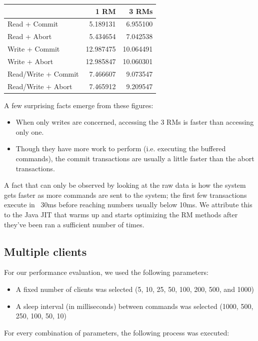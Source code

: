 \documentclass[11pt]{article}
\begin{document}
\begin{tabular}{l|r|r}
  ~ & 1 RM & 3 RMs \\
  \hline
  Read + Commit  & 5.189131 & 6.955100 \\
  Read + Abort   & 5.434654 & 7.042538 \\
  Write + Commit & 12.987475 & 10.064491 \\
  Write + Abort  & 12.985847 & 10.060301 \\
  Read/Write + Commit & 7.466607 & 9.073547 \\
  Read/Write + Abort  & 7.465912 & 9.209547 \\
\end{tabular}

A few surprising facts emerge from these figures:

\begin{itemize}
  \item When only writes are concerned, accessing the 3 RMs is faster
    than accessing only one.
  \item Though they have more work to perform (i.e. executing the
    buffered commands), the commit transactions are usually a little
    faster than the abort transactions.
\end{itemize}

A fact that can only be observed by looking at the raw data is how the
system gets faster as more commands are sent to the system; the first
few transactions execute in ~30ms before reaching numbers usually
below 10ms.  We attribute this to the Java JIT that warms up and
starts optimizing the RM methods after they've been ran a sufficient
number of times.

\subsection{Multiple clients}

For our performance evaluation, we used the following parameters:

\begin{itemize}
\item A fixed number of clients was selected (5, 10, 25, 50, 100, 200,
  500, and 1000)
\item A sleep interval (in milliseconds) between commands was selected
  (1000, 500, 250, 100, 50, 10)
\end{itemize}

For every combination of parameters, the following process was
executed:
\end{document}
